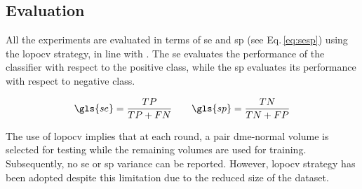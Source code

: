 \subsection{Evaluation}\label{sec:exp:evaluation}
All the experiments are evaluated in terms of \gls{se} and \gls{sp} (see Eq.\,\eqref{eq:sesp}) using the \gls{lopocv} strategy, in line with \cite{Lemaintre2015miccaiOCT}.
The \gls{se} evaluates the performance of the classifier with respect to the positive class, while the \gls{sp} evaluates its performance with respect to negative class.

\begin{align}
 \gls{se}  = \frac{TP}{TP+FN} \qquad \gls{sp} = \frac{TN}{TN+FP}
 \label{eq:sesp}
\end{align}

The use of \gls{lopocv} implies that at each round, a pair \gls{dme}-normal volume is selected for testing while the remaining volumes are used for training.
Subsequently, no \gls{se} or \gls{sp} variance can be reported.
However, \gls{lopocv} strategy has been adopted despite this limitation due to the reduced size of the dataset.

